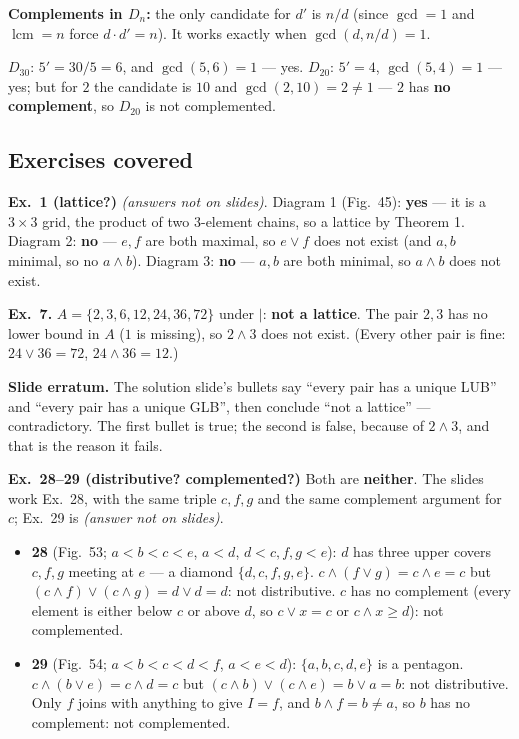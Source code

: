 \documentclass{fkt-notes}
\DeclareMathOperator{\lcm}{lcm}
\newcommand{\erratum}[1]{\par\noindent\textbf{Slide erratum.} #1\par}
\theoremstyle{definition}
\begin{document}
\textbf{Complements in $D_n$:} the only candidate for $d'$ is $n/d$
(since $\gcd = 1$ and $\lcm = n$ force $d \cdot d' = n$). It works
exactly when $\gcd(d, n/d) = 1$.

\begin{example}
  $D_{30}$: $5' = 30/5 = 6$, and $\gcd(5, 6) = 1$ --- yes.
  $D_{20}$: $5' = 4$, $\gcd(5, 4) = 1$ --- yes; but for $2$ the
  candidate is $10$ and $\gcd(2, 10) = 2 \ne 1$ --- $2$ has
  \textbf{no complement}, so $D_{20}$ is not complemented.
\end{example}

\subsection{Exercises covered}

\noindent\textbf{Ex.~1 (lattice?)} \emph{(answers not on slides)}.
Diagram 1 (Fig.~45): \textbf{yes} --- it is a $3\times3$ grid, the
product of two 3-element chains, so a lattice by Theorem 1.
Diagram 2: \textbf{no} --- $e,f$ are both maximal, so $e\vee f$ does
not exist (and $a,b$ minimal, so no $a\wedge b$). Diagram 3:
\textbf{no} --- $a,b$ are both minimal, so $a\wedge b$ does not exist.

\medskip
\noindent\textbf{Ex.~7.} $A=\{2,3,6,12,24,36,72\}$ under $\mid$:
\textbf{not a lattice}. The pair $2,3$ has no lower bound in $A$ ($1$
is missing), so $2\wedge3$ does not exist. (Every other pair is fine:
$24\vee36=72$, $24\wedge36=12$.)
\erratum{The solution slide's bullets say ``every pair has a unique
  LUB'' and ``every pair has a unique GLB'', then conclude ``not a
  lattice'' --- contradictory. The first bullet is true; the second is
  false, because of $2\wedge3$, and that is the reason it fails.}

\medskip
\noindent\textbf{Ex.~28--29 (distributive? complemented?)} Both are
\textbf{neither}. The slides work Ex.~28, with the same triple $c,f,g$
and the same complement argument for $c$; Ex.~29 is \emph{(answer not
  on slides)}.
\begin{itemize}
  \item \textbf{28} (Fig.~53; $a<b<c<e$, $a<d$, $d<c,f,g<e$): $d$ has
        three upper covers $c,f,g$ meeting at $e$ --- a diamond
        $\{d,c,f,g,e\}$. $c\wedge(f\vee g)=c\wedge e=c$ but
        $(c\wedge f)\vee(c\wedge g)=d\vee d=d$: not distributive. $c$ has no
        complement (every element is either below $c$ or above $d$, so
        $c\vee x=c$ or $c\wedge x\ge d$): not complemented.
  \item \textbf{29} (Fig.~54; $a<b<c<d<f$, $a<e<d$): $\{a,b,c,d,e\}$
        is a pentagon. $c\wedge(b\vee e)=c\wedge d=c$ but
        $(c\wedge b)\vee(c\wedge e)=b\vee a=b$: not distributive. Only $f$
        joins with anything to give $I=f$, and $b\wedge f=b\ne a$, so $b$
        has no complement: not complemented.
\end{itemize}
\end{document}
